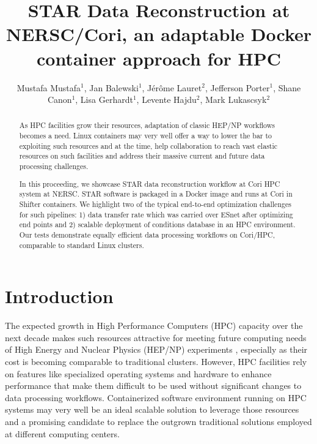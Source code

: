 \documentclass[a4paper]{jpconf}
\begin{document}
\title{STAR Data Reconstruction  at NERSC/Cori, an adaptable Docker container approach for HPC}

\author{Mustafa Mustafa$^1$, Jan Balewski$^1$, J\'{e}r\^{o}me Lauret$^2$, Jefferson Porter$^1$, Shane Canon$^1$, Lisa Gerhardt$^1$, Levente Hajdu$^2$,  Mark Lukascsyk$^2$}
\address{$^1$ Lawrence Berkeley National Laboratory, One Cyclotron Rd, Berkeley, CA 94720}
\address{$^2$ Brookhaven National Laboratory, NY 11973}

 \begin{abstract} 
  As HPC facilities grow their resources, adaptation of classic HEP/NP
   workflows becomes a need. Linux containers may very well offer a way to lower
   the bar to exploiting such resources and at the time, help collaboration to
   reach vast elastic resources on such facilities and address their massive
   current and future data processing challenges.  

In this proceeding, we showcase STAR data reconstruction workflow at Cori HPC
  system at NERSC. STAR software is packaged in a Docker image and runs at Cori
  in Shifter containers.  We highlight two of the typical end-to-end
  optimization challenges for such pipelines: 1) data transfer rate which was
  carried over ESnet after optimizing end points and 2) scalable deployment of
  conditions database in an HPC environment. Our tests demonstrate equally
  efficient data processing workflows on Cori/HPC, comparable to standard Linux
  clusters.
\end{abstract}

\section{Introduction} 
The expected growth in High Performance Computers (HPC) capacity over the next
decade makes such resources attractive for meeting future computing needs of
High Energy and Nuclear Physics (HEP/NP) experiments \cite{ascrhep}, especially as their cost is becoming
comparable to traditional clusters.  However, HPC facilities rely on features
like specialized operating systems and hardware to enhance performance that
make them difficult to be used without significant changes to data processing
workflows. Containerized software environment running on HPC systems may very
well be an ideal scalable solution to leverage those resources and a promising
candidate to replace the outgrown traditional solutions employed at different
computing centers.  
\end{document}
